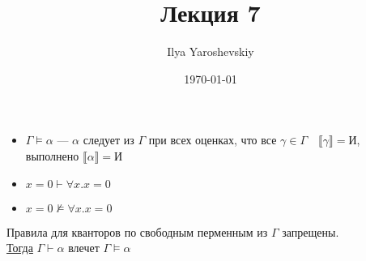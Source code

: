 \documentclass[english]{article}
\author{Ilya Yaroshevskiy}
\date{\today}
\title{Лекция 7}
\begin{document}
\maketitle
\tableofcontents

\begin{itemize}
	\item \(\Gamma \vDash \alpha\) --- \(\alpha\) следует из \(\Gamma\) при всех оценках, что все \(\gamma \in \Gamma\quad \llbracket \gamma \rrbracket = \text{И}\), выполнено \(\llbracket \alpha \rrbracket = \text{И}\)
	\item \(x = 0 \vdash \forall x. x = 0\)
	\item \(x = 0 \not\vDash \forall x. x = 0\)
\end{itemize}
\begin{definition}
	Правила для кванторов по свободным перменным из \(\Gamma\) запрещены. \\
	\uline{Тогда} \(\Gamma \vdash \alpha\) влечет \(\Gamma \vDash \alpha\)
	\label{org0a86b54}
\end{definition}
\end{document}
